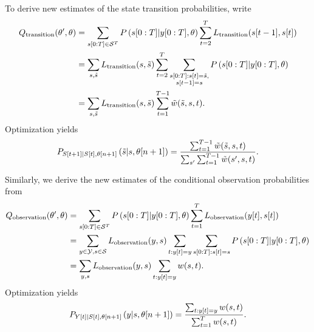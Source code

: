 To derive new estimates of the state transition probabilities, write
\begin{align}
  Q_{\text{transition}} (\parameters',\parameters) &=
  \sum_{\ts{s}{0}{T}\in\states^T} P
  \left(\ts{s}{0}{T}|\ts{y}{0}{T},\parameters \right) \sum_{t=2}^T
  L_{\text{transition}}(\ti{s}{t-1},\ti{s}{t})\\
  &= \sum_{s,{\tilde s}} L_{\text{transition}}(s,{\tilde s})
  \sum_{t=2}^T \sum_{\substack{\ts{s}{0}{T}:\ti{s}{t}={\tilde
        s},\\\ti{s}{t-1}=s}}
  P\left(\ts{s}{0}{T}|\ts{y}{0}{T},\parameters \right)\\
  &= \sum_{s,{\tilde s}} L_{\text{transition}}(s,{\tilde s})
  \sum_{t=1}^{T-1} {\tilde w}({\tilde s},s,t).
\end{align}
Optimization yields
\begin{equation}
  \label{eq:NewTrans}
  P_{{S}{[t+1]}|{S}{[t]},{\theta}{[n+1]}} \left({\tilde
      s}|s,{\theta}{[n+1]} \right) = \frac
  {\sum_{t=1}^{T-1} {\tilde w}({\tilde s},s,t)} {\sum_{s'}
    \sum_{t=1}^{T-1} {\tilde w}(s',s,t)}.
\end{equation}

Similarly, we derive the new estimates of the conditional observation
probabilities from
\begin{align}
  \label{eq:Qout1}
  Q_{\text{observation}} (\parameters',\parameters) &=
  \sum_{\ts{s}{0}{T}\in\states^T} P
  \left(\ts{s}{0}{T}|\ts{y}{0}{T},\parameters \right) \sum_{t=1}^T
  L_{\text{observation}}(\ti{y}{t},\ti{s}{t})\\
  &= \sum_{y\in\outputs,s\in\states} L_{\text{observation}}(y,s)
  \sum_{t:\ti{y}{t}=y}
  \sum_{\ts{s}{0}{T}:\ti{s}{t}=s }P
  \left(\ts{s}{0}{T}|\ts{y}{0}{T},\parameters \right) \\
  &= \sum_{y,s} L_{\text{observation}}(y,s) \sum_{t:\ti{y}{t}=y} w(s,t).
\end{align}
Optimization yields
\begin{equation}
  \label{eq:NewOut}
  P_{{Y}{[t]}|{S}{[t]},{\theta}{[n+1]}}
  \left(y|s,{\theta}{[n+1]} \right) = \frac
  {\sum_{t:{y}{[t]}=y} w(s,t)} {\sum_{t=1}^T w(s,t)}.
\end{equation}

